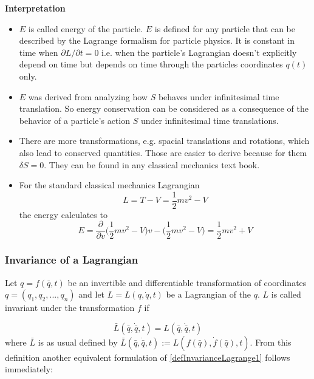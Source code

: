 \documentclass{article}
\begin{document}
\textbf{Interpretation}
\begin{itemize}
\item $E$ is called energy of the particle. $E$ is defined for any particle that can be described by the Lagrange formalism for particle physics. It is constant in time when $\partial L / \partial t = 0 $ i.e. when the particle's Lagrangian doesn't explicitly depend on time but depends on time through the particles coordinates $q(t)$ only.

\item 
$E$ was derived from analyzing how $S$ behaves under infinitesimal time translation. So energy conservation can be considered as a consequence of the behavior of a particle's action $S$ under infinitesimal time translations.

\item
There are more transformations, e.g. spacial translations and rotations, which also lead to conserved quantities. 
Those are easier to derive because for them $\delta S = 0$. They can be found in any classical mechanics text book.

\item
For the standard classical mechanics Lagrangian
\begin{equation}
L = T-V = \frac{1}{2} m v^2 - V 
\end{equation}
the energy calculates to
\begin{equation}
E = \frac{\partial}{\partial v} \bigg(\frac{1}{2} m v^2 - V \bigg) v - \bigg(\frac{1}{2} m v^2 - V\bigg) =  \frac{1}{2} m v^2 + V
\end{equation}

\end{itemize}

\subsubsection{Invariance of a Lagrangian} \label{sectionInvariance}
Let $q=f(\bar{q},t)$ be an invertible and differentiable transformation of coordinates $q=(q_1,q_2, ...,q_n)$ and let $L=L(q, \dot{q},t)$ be a Lagrangian of the $q$.
$L$ is called invariant under the transformation $f$ if

\begin{equation} \label{defInvarianceLagrange1}
    \bar{L}(\bar{q},\dot{\bar{q}},t) = L(\bar{q},\dot{\bar{q}},t)
\end{equation}
where $\bar{L}$ is as usual defined by $\bar{L}(\bar{q},\dot{\bar{q}},t) := L(f(\bar{q}), \dot{f}(\bar{q}),t)$.
From this definition another equivalent formulation of \ref{defInvarianceLagrange1} follows immediately:
\end{document}
